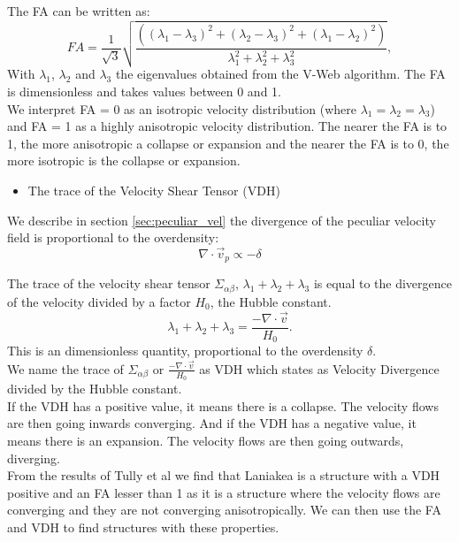 \documentclass[12pt]{article}
\begin{document}
The FA can be written as:
\[
FA = \frac{1}{\sqrt{3}} \sqrt{\frac{( \left( \lambda_1 - \lambda_3 \right)^2 + \left( \lambda_2 - \lambda_3 \right)^2 + \left( \lambda_1 - \lambda_2 \right)^2  )}{\lambda^{2}_1 + \lambda^{2}_2 + \lambda^{2}_3}} ,
\]
With $\lambda_1$, $\lambda_2$ and $\lambda_3$ the
 eigenvalues obtained from the V-Web algorithm. The FA is
  dimensionless and takes values between 0 and
   1. \\
We interpret FA = 0 as an isotropic velocity distribution
 (where $\lambda_1 = \lambda_2 =
    \lambda_3$) and FA = 1 as a highly anisotropic
     velocity distribution. The nearer the FA is to 1, the
      more anisotropic a collapse or expansion and the nearer
       the FA is to 0, the more isotropic is the collapse or
        expansion.

\begin{itemize}
\item The trace of the Velocity Shear Tensor (VDH)
\end{itemize}

We describe in section \ref{sec:peculiar_vel} the divergence of the peculiar velocity field is proportional to the overdensity:
\[
\nabla \cdot \vec{v}_p \propto - \delta
\]

The trace of the velocity shear tensor $\Sigma
 _{\alpha\beta}$, $\lambda_1 + \lambda_2 + \lambda_3$ is
 equal to the divergence of the velocity divided by a
  factor $H_0$, the Hubble constant.
\[
\lambda_1 + \lambda_2 + \lambda_3 = \frac{- \nabla \cdot \vec{v}}{H_0} .
\]
This is an dimensionless quantity, proportional to the
 overdensity $\delta$.\\

We name the trace of $\Sigma_{\alpha\beta}$ or $\frac{-
 \nabla \cdot \vec{v}}{H_0}$ as VDH which states as
 Velocity Divergence divided by the Hubble constant. \\

If the VDH has a positive value, it means there is a
 collapse. The velocity flows are then going inwards
  converging. And if the VDH has a negative value, it means
   there is an expansion. The velocity flows are then going
    outwards, diverging. \\

From the results of Tully et al \cite{tully_laniakea_2014} we
 find that Laniakea is a structure with a VDH positive and an
  FA lesser than 1 as it is a structure where the velocity
   flows are converging and they are not converging 
    anisotropically. We can then use the FA and VDH to find
     structures with these properties.\\
 
\end{document}
